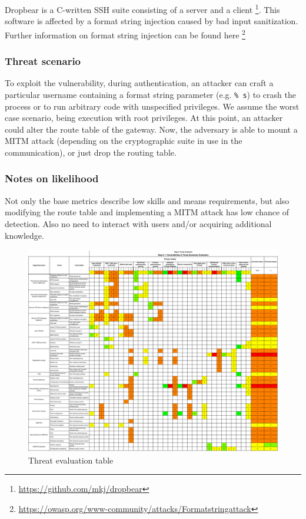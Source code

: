Dropbear is a C-written SSH suite consisting of a server and a client \footnote{\href{https://github.com/mkj/dropbear} {https://github.com/mkj/dropbear}}. This software is affected by a format string injection caused by bad input sanitization. Further information on format string injection can be found here \footnote{\href{https://owasp.org/www-community/attacks/Format_string_attack} {https://owasp.org/www-community/attacks/Format\textunderscore string\textunderscore attack}}

\subsubsection*{Threat scenario}

To exploit the vulnerability, during authentication, an attacker can craft a particular username containing a format string parameter (e.g. \texttt{\% s}) to crash the process or to run arbitrary code with unspecified privileges. We assume the worst case scenario, being execution with root privileges. At this point, an attacker could alter the route table of the gateway. Now, the adversary is able to mount a MITM attack (depending on the cryptographic suite in use in the communication), or just drop the routing table.

\subsubsection*{Notes on likelihood}

Not only the base metrics describe low skills and means requirements, but also modifying the route table and implementing a MITM attack has low chance of detection. Also no need to interact with users and/or acquiring additional knowledge.

\begin{figure}[h!]
    \centering
    \includegraphics[keepaspectratio,width=1\textwidth]{03-risk-analysis/003-TE/img/threatEval.pdf}
    \caption{Threat evaluation table}
    \label{fig:threatsEval}
\end{figure}


